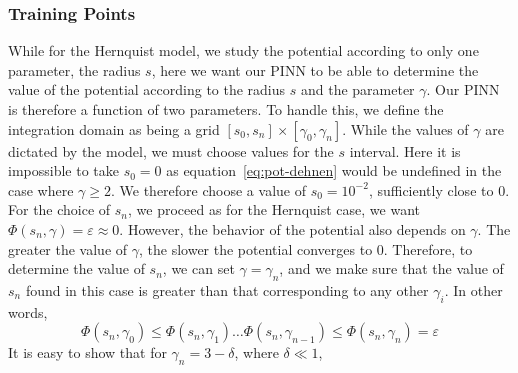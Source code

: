 \subsubsection{Training Points}

While for the Hernquist model, we study the potential according to only one parameter, the radius $s$, here we want our PINN to be able to determine the value of the potential according to the radius $s$ and the parameter $\gamma$. Our PINN is therefore a function of two parameters. To handle this, we define the integration domain as being a grid $[s_0, s_n] \times [\gamma_0, \gamma_n]$. While the values of $\gamma$ are dictated by the model, we must choose values for the $s$ interval. Here it is impossible to take $s_0=0$ as equation~\eqref{eq:pot-dehnen} would be undefined in the case where $\gamma \geq 2$. We therefore choose a value of $s_0=10^{-2}$, sufficiently close to $0$. For the choice of $s_n$, we proceed as for the Hernquist case, we want $\Phi(s_n, \gamma) = \varepsilon \approx 0$. However, the behavior of the potential also depends on $\gamma$. The greater the value of $\gamma$, the slower the potential converges to $0$. Therefore, to determine the value of $s_n$, we can set $\gamma = \gamma_n$, and we make sure that the value of $s_n$ found in this case is greater than that corresponding to any other $\gamma_i$. In other words,
\begin{equation*}
    \Phi(s_n, \gamma_0) \leq \Phi(s_n, \gamma_1) \dots \Phi(s_n, \gamma_{n-1}) \leq \Phi(s_n, \gamma_n) = \varepsilon
\end{equation*} It is easy to show that for $\gamma_n = 3 - \delta$, where $\delta \ll 1$,

